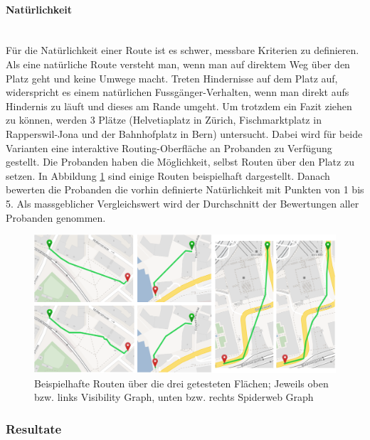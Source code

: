 \paragraph{Natürlichkeit}\label{criteria:Natürlichkeit}~\\
Für die Natürlichkeit einer Route ist es schwer, messbare Kriterien zu definieren. Als eine natürliche Route versteht man, wenn man auf direktem Weg über den Platz geht und keine Umwege macht. Treten Hindernisse auf dem Platz auf, widerspricht es einem natürlichen Fussgänger-Verhalten, wenn man direkt aufs Hindernis zu läuft und dieses am Rande umgeht. Um trotzdem ein Fazit ziehen zu können, werden 3 Plätze (Helvetiaplatz in Zürich, Fischmarktplatz in Rapperswil-Jona und der Bahnhofplatz in Bern) untersucht. Dabei wird für beide Varianten eine interaktive Routing-Oberfläche an Probanden zu Verfügung gestellt. Die Probanden haben die Möglichkeit, selbst Routen über den Platz zu setzen. In Abbildung \ref{fig:algorithm-example-routes} sind einige Routen beispielhaft dargestellt. Danach bewerten die Probanden die vorhin definierte Natürlichkeit mit Punkten von 1 bis 5. Als massgeblicher Vergleichswert wird der Durchschnitt der Bewertungen aller Probanden genommen.

\begin{figure}[ht]
    \centering
    \includegraphics[width=1\linewidth]{technicalreport/img/algorithm-comparison-routes}
    \caption[Beispielhafte Routen für Natürlichkeits-Test]{Beispielhafte Routen über die drei getesteten Flächen; Jeweils oben bzw. links Visibility Graph, unten bzw. rechts Spiderweb Graph}
    \label{fig:algorithm-example-routes}
\end{figure}


\subsubsection{Resultate}
\label{sub:Resultate}


